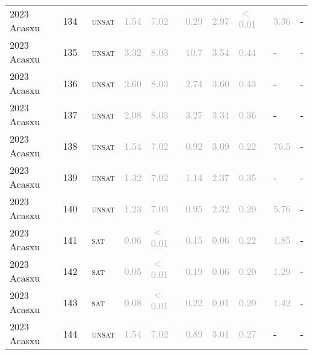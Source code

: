 \begin{center}
{\begin{longtable}{@{}llllllllll@{}}
2023 Acasxu & 134 & ~\textsc{unsat} & \textcolor{darkgray}{1.54} & \textcolor{darkgray}{7.02} & \textcolor{darkgray}{0.29} & \textcolor{darkgray}{2.97} & \textcolor{darkgray}{$<$0.01} & \textcolor{darkgray}{3.36} & - \\
2023 Acasxu & 135 & ~\textsc{unsat} & \textcolor{darkgray}{3.32} & \textcolor{darkgray}{8.03} & \textcolor{darkgray}{10.7} & \textcolor{darkgray}{3.54} & \textcolor{darkgray}{0.44} & - & - \\
2023 Acasxu & 136 & ~\textsc{unsat} & \textcolor{darkgray}{2.60} & \textcolor{darkgray}{8.03} & \textcolor{darkgray}{2.74} & \textcolor{darkgray}{3.60} & \textcolor{darkgray}{0.43} & - & - \\
2023 Acasxu & 137 & ~\textsc{unsat} & \textcolor{darkgray}{2.08} & \textcolor{darkgray}{8.03} & \textcolor{darkgray}{3.27} & \textcolor{darkgray}{3.34} & \textcolor{darkgray}{0.36} & - & - \\
2023 Acasxu & 138 & ~\textsc{unsat} & \textcolor{darkgray}{1.54} & \textcolor{darkgray}{7.02} & \textcolor{darkgray}{0.92} & \textcolor{darkgray}{3.09} & \textcolor{darkgray}{0.22} & \textcolor{darkgray}{76.5} & - \\
2023 Acasxu & 139 & ~\textsc{unsat} & \textcolor{darkgray}{1.32} & \textcolor{darkgray}{7.02} & \textcolor{darkgray}{1.14} & \textcolor{darkgray}{2.37} & \textcolor{darkgray}{0.35} & - & - \\
2023 Acasxu & 140 & ~\textsc{unsat} & \textcolor{darkgray}{1.23} & \textcolor{darkgray}{7.03} & \textcolor{darkgray}{0.95} & \textcolor{darkgray}{2.32} & \textcolor{darkgray}{0.29} & \textcolor{darkgray}{5.76} & - \\
2023 Acasxu & 141 & ~\textsc{sat} & \textcolor{darkgray}{0.06} & \textcolor{darkgray}{$<$0.01} & \textcolor{darkgray}{0.15} & \textcolor{darkgray}{0.06} & \textcolor{darkgray}{0.22} & \textcolor{darkgray}{1.85} & - \\
2023 Acasxu & 142 & ~\textsc{sat} & \textcolor{darkgray}{0.05} & \textcolor{darkgray}{$<$0.01} & \textcolor{darkgray}{0.19} & \textcolor{darkgray}{0.06} & \textcolor{darkgray}{0.20} & \textcolor{darkgray}{1.29} & - \\
2023 Acasxu & 143 & ~\textsc{sat} & \textcolor{darkgray}{0.08} & \textcolor{darkgray}{$<$0.01} & \textcolor{darkgray}{0.22} & \textcolor{darkgray}{0.01} & \textcolor{darkgray}{0.20} & \textcolor{darkgray}{1.42} & - \\
2023 Acasxu & 144 & ~\textsc{unsat} & \textcolor{darkgray}{1.54} & \textcolor{darkgray}{7.02} & \textcolor{darkgray}{0.89} & \textcolor{darkgray}{3.01} & \textcolor{darkgray}{0.27} & - & - \\

\end{longtable}}
\end{center}
